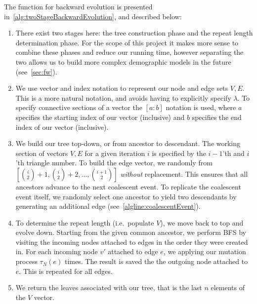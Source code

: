 The function for backward evolution is presented in~\autoref{alg:twoStageBackwardEvolution}, and described below:
\begin{enumerate}
    \item There exist two stages here: the tree construction phase and the repeat length determination phase.
        For the scope of this project it makes more sense to combine these phases and reduce our running time, however
        separating the two allows us to build more complex demographic models in the future (see~\autoref{sec:fw}).
    \item We use vector and index notation to represent our node and edge sets $V, E$.
        This is a more natural notation, and avoids having to explicitly specify $\lambda$.
        To specify connective sections of a vector the $[a:b]$ notation is used, where $a$ specifies the starting
        index of our vector (inclusive) and $b$ specifies the end index of our vector (inclusive).
    \item We build our tree top-down, or from ancestor to descendant.
        The working section of vectors $V, E$ for a given iteration $i$ is specified by the $i - 1$'th and $i$'th
        triangle number.
        To build the edge vector, we randomly from $\left[\binom{i}{2} + 1, \binom{i}{2} + 2, \ldots,
        \binom{i + 1}{2}\right]$
        \emph{without} replacement.
        This ensures that all ancestors advance to the next coalescent event.
        To replicate the coalescent event itself, we randomly select one ancestor to yield two descendants by generating
        an additional edge (see~\autoref{algline:coalescentEvent}).
    \item To determine the repeat length (i.e.\ populate $V$), we move back to top and evolve down.
        Starting from the given common ancestor, we perform BFS by visiting the incoming nodes attached to edges in
        the order they were created in.
        For each incoming node $v'$ attached to edge $e$, we applying our mutation process $\tau_N(e)$ times.
        The result is saved the the outgoing node attached to $e$.
        This is repeated for all edges.
    \item We return the leaves associated with our tree, that is the last $n$ elements of the $V$ vector.
\end{enumerate}

